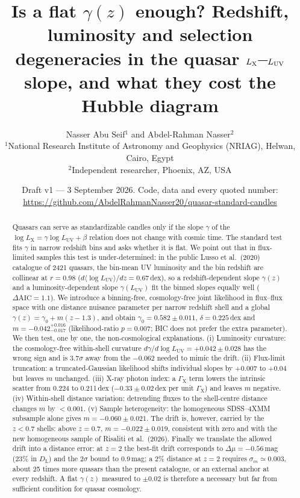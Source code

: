 \documentclass[twocolumn,10pt]{article}
\title{\Large\bf Is a flat $\gamma(z)$ enough? Redshift, luminosity and selection\\
degeneracies in the quasar $\LX$--$\LUV$ slope, and what they cost the Hubble diagram}
\author{Nasser Abu Seif$^{1}$ and Abdel-Rahman Nasser$^{2}$\\[3pt]
\small $^{1}$National Research Institute of Astronomy and Geophysics (NRIAG), Helwan, Cairo, Egypt\\
\small $^{2}$Independent researcher, Phoenix, AZ, USA}
\date{\small Draft v1 --- 3 September 2026. Code, data and every quoted number: \url{https://github.com/AbdelRahmanNasser20/quasar-standard-candles}}
\newcommand{\LX}{L_{\mathrm{X}}}
\newcommand{\LUV}{L_{\mathrm{UV}}}
\newcommand{\DL}{D_{\mathrm{L}}}
\begin{document}
\maketitle

\begin{abstract}
\noindent
Quasars can serve as standardizable candles only if the slope $\gamma$ of the $\log\LX=\gamma\log\LUV+\beta$ relation does not change with cosmic time. The standard test fits $\gamma$ in narrow redshift bins and asks whether it is flat. We point out that in flux-limited samples this test is under-determined: in the public Lusso et al.\ (2020) catalogue of 2421 quasars, the bin-mean UV luminosity and the bin redshift are collinear at $r=0.98$ ($d\langle\log\LUV\rangle/dz=0.67$\,dex), so a redshift-dependent slope $\gamma(z)$ and a luminosity-dependent slope $\gamma(\LUV)$ fit the binned slopes equally well ($\Delta{\mathrm{AIC}}=1.1$). We introduce a binning-free, cosmology-free joint likelihood in flux--flux space with one distance nuisance parameter per narrow redshift shell and a global $\gamma(z)=\gamma_0+m(z-1.3)$, and obtain $\gamma_0=0.582\pm0.011$, $\delta=0.225$\,dex and $m=-0.042^{+0.016}_{-0.017}$ (likelihood-ratio $p=0.007$; BIC does not prefer the extra parameter). We then test, one by one, the non-cosmological explanations. (i) Luminosity curvature: the cosmology-free within-shell curvature $d\gamma/d\log\LUV=+0.042\pm0.028$ has the wrong sign and is $3.7\sigma$ away from the $-0.062$ needed to mimic the drift. (ii) Flux-limit truncation: a truncated-Gaussian likelihood shifts individual slopes by $+0.007$ to $+0.04$ but leaves $m$ unchanged. (iii) X-ray photon index: a $\Gamma_{\mathrm{X}}$ term lowers the intrinsic scatter from 0.224 to 0.211\,dex ($-0.33\pm0.02$\,dex per unit $\Gamma_{\mathrm{X}}$) and leaves $m$ negative. (iv) Within-shell distance variation: detrending fluxes to the shell-centre distance changes $m$ by $<0.001$. (v) Sample heterogeneity: the homogeneous SDSS--4XMM subsample alone gives $m=-0.060\pm0.021$. The drift is, however, carried by the $z<0.7$ shells: above $z=0.7$, $m=-0.022\pm0.019$, consistent with zero and with the new homogeneous sample of Risaliti et al.\ (2026). Finally we translate the allowed drift into a distance error: at $z=2$ the best-fit drift corresponds to $\Delta\mu=-0.56$\,mag (23\% in $\DL$) and the $2\sigma$ bound to 0.9\,mag; a 2\% distance at $z=2$ requires $\sigma_m\simeq0.003$, about 25 times more quasars than the present catalogue, or an external anchor at every redshift. A flat $\gamma(z)$ measured to $\pm0.02$ is therefore a necessary but far from sufficient condition for quasar cosmology.
\end{abstract}
\end{document}
